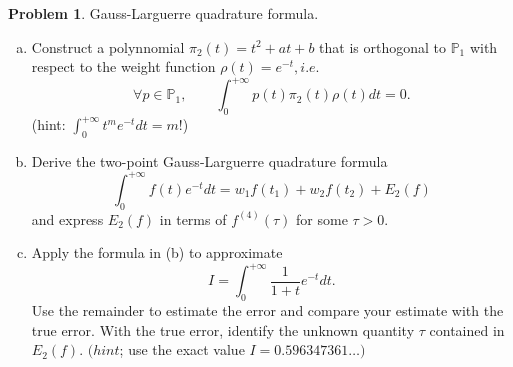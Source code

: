 \documentclass[a4paper]{book}
\numberwithin{equation}{chapter}
\theoremstyle{definition}
\newtheorem{pro}[exm]{Problem}
\begin{document}
\begin{pro}
  Gauss-Larguerre quadrature formula.

  \begin{enumerate}[(a)]
  \item Construct a polynnomial $\pi_2(t) = t^2 + at + b$ that is orthogonal to $\mathbb{P}_1$ with respect to the weight function $\rho(t) = e^{-t},i.e. $
    \[\forall p \in \mathbb{P}_1, \qquad \int_0^{+\infty} p(t) \pi_2(t) \rho(t) dt = 0.\]
    (hint: $\int_0^{+\infty} t^m e^{-t}dt = m! $)

  \item Derive the two-point Gauss-Larguerre quadrature formula
    \[\int_0^{+\infty} f(t) e^{-t}dt = w_1 f(t_1) +  w_2 f(t_2) + E_2(f)\]
    and express $E_2(f)$ in terms of $f^{(4)}(\tau)$ for some $\tau > 0$.

  \item Apply the formula in (b) to approximate
    \[I = \int_0^{+\infty} \frac{1}{1+t} e^{-t} dt.\]
    Use the remainder to estimate the error and compare your estimate with the true error. With the true error, identify the unknown quantity $\tau$ contained in $E_2(f)$.
    $(hint$; use the exact value $I = 0.596347361\ldots)$
  \end{enumerate}
\end{pro}
\end{document}

